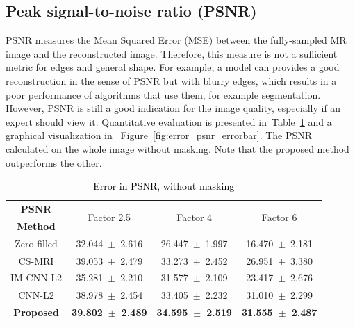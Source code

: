 \documentclass[review]{elsarticle}
\begin{document}
\subsection{Peak signal-to-noise ratio (PSNR)}
PSNR measures the Mean Squared Error (MSE) between the fully-sampled MR image and the reconstructed image. Therefore, this measure is not a sufficient metric for edges and general shape. For example, a model can provides a good reconstruction in the sense of PSNR but with blurry edges, which results in a poor performance of algorithms that use them, for example segmentation.
However, PSNR is still a good indication for the image quality, especially if an expert should view it.
Quantitative evaluation is presented in~Table~\ref{tbl:PSNR_NO_MASK} and a graphical visualization in ~Figure~\ref{fig:error_psnr_errorbar}. The PSNR calculated on the whole image without masking. Note that the proposed method outperforms the other.

%


\begin{table}[H]
	\centering{}
	\begin{tabular}{|c||c||c||c|}
		\hline 
		\textbf{PSNR} & \multicolumn{1}{c||}{\multirow{2}{*}{Factor 2.5}} & \multicolumn{1}{c||}{\multirow{2}{*}{Factor 4}} & \multicolumn{1}{c|}{\multirow{2}{*}{Factor 6}} \tabularnewline
		\textbf{Method} & \multicolumn{1}{c||}{} & \multicolumn{1}{c||}{} & \multicolumn{1}{c|}{} \tabularnewline \cline{1-4}
		
		Zero-filled         &32.044~$\pm$~2.616  &26.447~$\pm$~1.997   &16.470~$\pm$~2.181\tabularnewline
		CS-MRI              &39.053~$\pm$~2.479  &33.273~$\pm$~2.452   &26.951~$\pm$~3.380\tabularnewline
		IM-CNN-L2           &35.281~$\pm$~2.210  &31.577~$\pm$~2.109   &23.417~$\pm$~2.676\tabularnewline
		CNN-L2              &38.978~$\pm$~2.454  &33.405~$\pm$~2.232   &31.010~$\pm$~2.299\tabularnewline
		\textbf{Proposed}   &\textbf{39.802~$\pm$~2.489}  &\textbf{34.595~$\pm$~2.519}   &\textbf{31.555~$\pm$~2.487}\tabularnewline
		\hline 
	\end{tabular}\caption{\textcolor{black}{\footnotesize{}{}Error in PSNR, without masking}{\footnotesize{}\label{tbl:PSNR_NO_MASK}}}
\end{table}
\end{document}
